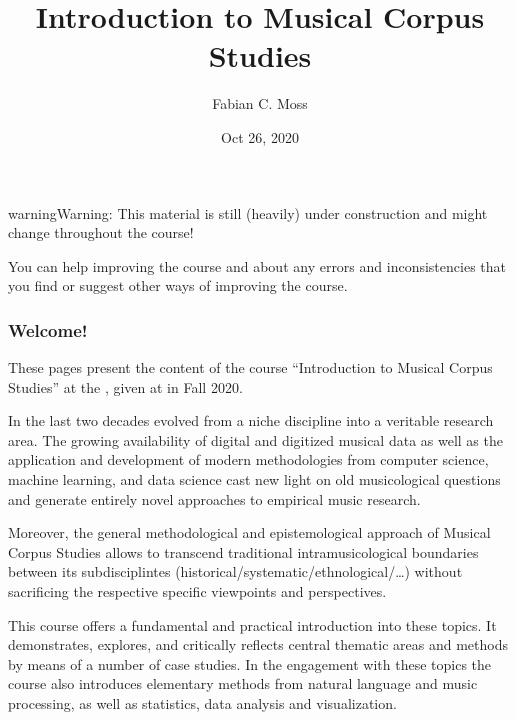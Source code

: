 \documentclass[letterpaper,10pt,english]{sphinxmanual}
\title{Introduction to Musical Corpus Studies}
\date{Oct 26, 2020}
\author{Fabian C.\@{} Moss}
\begin{document}
\pagestyle{empty}
\sphinxmaketitle
\pagestyle{plain}
\sphinxtableofcontents
\pagestyle{normal}
\label{\detokenize{index::doc}}



\begin{sphinxadmonition}{warning}{Warning:}
This material is still (heavily) under construction and might change throughout the course!

You can help improving the course and  about any errors and inconsistencies that you find
or suggest other ways of improving the course.
\end{sphinxadmonition}
\subsubsection*{Welcome!}

These pages present the content of the course “Introduction to Musical Corpus Studies” at the ,
given at  in Fall 2020.

In the last two decades  evolved from a niche discipline into a veritable research area.
The growing availability of digital and digitized musical data as well as the application and development of modern
methodologies from computer science, machine learning, and data science cast new light on old musicological questions
and generate entirely novel approaches to empirical music research.

Moreover, the general methodological and epistemological approach of Musical Corpus Studies allows to transcend traditional
intra\sphinxhyphen{}musicological boundaries between its sub\sphinxhyphen{}disciplintes (historical/systematic/ethnological/…) without sacrificing the
respective specific viewpoints and perspectives.

This course offers a fundamental and practical introduction into these topics.
It demonstrates, explores, and critically reflects central thematic areas and methods by means of a number of case studies.
In the engagement with these topics the course also introduces elementary methods from natural language and music processing,
as well as statistics, data analysis and visualization.
\end{document}
